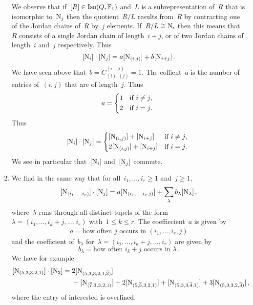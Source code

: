\documentclass[a4paper,11pt]{scrartcl}
\begin{document}
\begin{example}
\begin{enumerate}
      We observe that if~$[R] \in \operatorname{Iso}(Q, \mathbb{F}_1)$ and~$L$ is a subrepresentation of~$R$ that is isomorphic to~$\mathrm{N}_j$ then the quotient~$R/L$ results from~$R$ by contracting one of the Jordan chains of~$R$ by~$j$ elements.
      If~$R/L \cong \mathrm{N}_i$ then this means that~$R$ consists of a single Jordan chain of length~$i+j$, or of two Jordan chains of length~$i$ and~$j$ respectively.
      Thus
      \[
        [\mathrm{N}_i] \cdot [\mathrm{N}_j]
        =
        a [ \mathrm{N}_{(i,j)} ]
        +
        b [ \mathrm{N}_{i+j} ] \,.
      \]
      We have seen above that~$b = C^{(i+j)}_{(i),(j)} = 1$.
      The coffient~$a$ is the number of entries of~$(i,j)$ that are of length~$j$.
      Thus
      \[
        a
        =
        \begin{cases*}
          1
          &
          if~$i \neq j$,
          \\
          2
          &
          if~$i = j$.
        \end{cases*}
      \]
      Thus
      \[
        \class{\Nil_i} \cdot \class{\Nil_j}
        =
        \begin{cases*}
          \class{\Nil_{(i,j)}} + \class{\Nil_{i+j}}
          &
          if~$i \neq j$,
          \\
          2 \class{\Nil_{(i,j)}} + \class{\Nil_{i+j}}
          &
          if~$i = j$.
        \end{cases*}
      \]
      We see in particular that~$[\mathrm{N}_i]$ and~$[\mathrm{N}_j]$ commute.
    \item
      We find in the same way that for all~$i_1, \dotsc, i_r \geq 1$ and~$j \geq 1$,
      \[
        [ \mathrm{N}_{(i_1, \dotsc, i_r)} ] \cdot [ \mathrm{N}_j ]
        =
        a [ \mathrm{N}_{(i_1, \dotsc, i_r, j)} ]
        +
        \sum_{\lambda} b_\lambda [ \mathrm{N}_\lambda ] \,,
      \]
      where~$\lambda$ runs through all distinct tupels of the form~$\lambda = (i_1, \dotsc, i_k + j, \dotsc, i_r)$ with~$1 \leq k \leq r$.
      The coeffiecient~$a$ is given by
      \begin{align*}
        a
        =
        \text{how often~$j$ occurs in~$(i_1, \dotsc, i_r, j)$}
      \end{align*}
      and the coefficient of~$b_\lambda$ for~$\lambda = (i_1, \dotsc, i_k + j, \dotsc, i_r)$ are given by
      \[
        b_\lambda
        =
        \text{how often~$i_k + j$ occurs in~$\lambda$} \,.
      \]
      We have for example
      \begin{align*}
        [ \mathrm{N}_{(5, 3, 3, 2, 1)} ] \cdot [ \mathrm{N}_2 ]
        ={}&
          2 [ \mathrm{N}_{(5, 3, 3, 2, 1, \overline{2})} ]
        \\
        {}&
        +   [ \mathrm{N}_{(\overline{7}, 3, 3, 2, 1)} ]
        + 2 [ \mathrm{N}_{(5, \overline{5}, 3, 2, 1)} ]
        +   [ \mathrm{N}_{(5, 3, 3, \overline{4}, 1)} ]
        + 3 [ \mathrm{N}_{(5, 3, 3, 2, \overline{3})} ] \,,
      \end{align*}
      where the entry of interested is overlined.


\end{enumerate}
\end{example}
\end{document}
